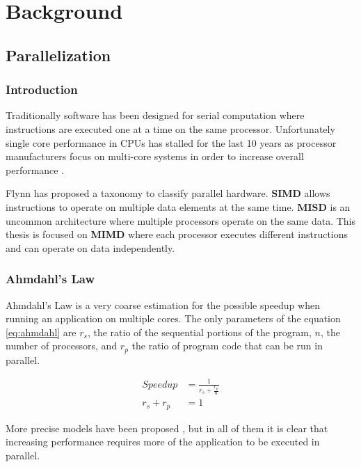 \chapter{Background}

\section {Parallelization}

\subsection{Introduction}

Traditionally software has been designed for serial computation where instructions are executed one at a time on the same processor. Unfortunately single core performance in CPUs has stalled for the last 10 years as processor manufacturers focus on multi-core systems in order to increase overall performance \cite{procspeed2}.

Flynn has proposed a taxonomy \cite{flynn} to classify parallel hardware. \textbf{SIMD} allows instructions to operate on multiple data elements at the same time. \textbf{MISD} is an uncommon architecture where multiple processors operate on the same data. This thesis is focused on \textbf{MIMD} where each processor executes different instructions and can operate on data independently.

\subsection{Ahmdahl's Law}

Ahmdahl's Law \cite{amdahl} is a very coarse estimation for the possible speedup when running an application on multiple cores. The only parameters of the equation \ref{eq:ahmdahl} are $r_s$, the ratio of the sequential portions of the program, $n$, the number of processors, and $r_p$ the ratio of program code that can be run in parallel.

\begin{equation} \label{eq:ahmdahl}
	\begin{aligned}
		Speedup &= \frac{1}{r_s + \frac{r_p}{n}} \\
		r_s + r_p &= 1
	\end{aligned}
\end{equation}

More precise models have been proposed \cite{gustafson}, but in all of them it is clear that increasing performance requires more of the application to be executed in parallel.

